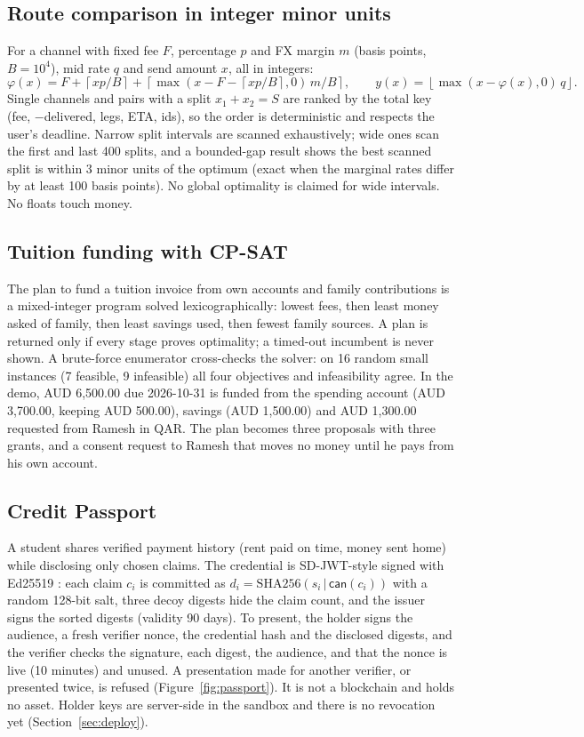 \documentclass[11pt,a4paper]{article}
\renewcommand{\mathrm}[1]{\text{#1}}}
\newcommand{\ceil}[1]{\left\lceil #1\right\rceil}
\newcommand{\floor}[1]{\left\lfloor #1\right\rfloor}
\begin{document}
\subsection{Route comparison in integer minor units}
For a channel with fixed fee $F$, percentage $p$ and FX margin $m$ (basis points, $B=10^4$), mid rate $q$ and send amount $x$, all in integers:
\begin{equation*}
\varphi(x)=F+\ceil{xp/B}+\ceil{\max(x-F-\ceil{xp/B},0)\,m/B},\qquad y(x)=\floor{\max(x-\varphi(x),0)\,q}.
\end{equation*}
Single channels and pairs with a split $x_1+x_2=S$ are ranked by the total key (fee, $-$delivered, legs, ETA, ids), so the order is deterministic and respects the user's deadline. Narrow split intervals are scanned exhaustively; wide ones scan the first and last 400 splits, and a bounded-gap result shows the best scanned split is within 3 minor units of the optimum (exact when the marginal rates differ by at least 100 basis points). No global optimality is claimed for wide intervals. No floats touch money.

\subsection{Tuition funding with CP-SAT}
The plan to fund a tuition invoice from own accounts and family contributions is a mixed-integer program solved lexicographically: lowest fees, then least money asked of family, then least savings used, then fewest family sources. A plan is returned only if every stage proves optimality; a timed-out incumbent is never shown. A brute-force enumerator cross-checks the solver: on 16 random small instances (7 feasible, 9 infeasible) all four objectives and infeasibility agree. In the demo, AUD 6,500.00 due 2026-10-31 is funded from the spending account (AUD 3,700.00, keeping AUD 500.00), savings (AUD 1,500.00) and AUD 1,300.00 requested from Ramesh in QAR. The plan becomes three proposals with three grants, and a consent request to Ramesh that moves no money until he pays from his own account.

\subsection{Credit Passport}
A student shares verified payment history (rent paid on time, money sent home) while disclosing only chosen claims. The credential is SD-JWT-style \cite{rfc9901} signed with Ed25519 \cite{rfc8032}: each claim $c_i$ is committed as $d_i=\mathrm{SHA256}(s_i\,|\,\mathsf{can}(c_i))$ with a random 128-bit salt, three decoy digests hide the claim count, and the issuer signs the sorted digests (validity 90 days). To present, the holder signs the audience, a fresh verifier nonce, the credential hash and the disclosed digests, and the verifier checks the signature, each digest, the audience, and that the nonce is live (10 minutes) and unused. A presentation made for another verifier, or presented twice, is refused (Figure~\ref{fig:passport}). It is not a blockchain and holds no asset. Holder keys are server-side in the sandbox and there is no revocation yet (Section~\ref{sec:deploy}).
\end{document}
